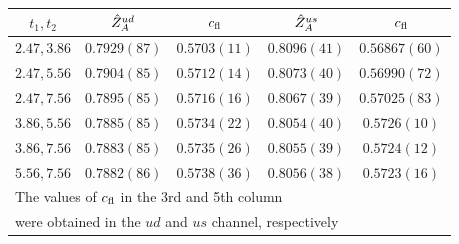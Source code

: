 \topinsert
{}
\begin{center}
\renewcommand{\arraystretch}{1.25}
\begin{tabular}{ccccc}
\hline\hline
$t_1,t_2$ & $\hat{Z}_A^{ud}$ & $c_{\rm fl}$ & $\hat{Z}_A^{us}$ & $c_{\rm fl}$ \\
\hline
$2.47,3.86$ & $0.7929(87)$ & $0.5703(11)$  & $0.8096(41)$ & $0.56867(60)$ \\
$2.47,5.56$ & $0.7904(85)$ & $0.5712(14)$  & $0.8073(40)$ & $0.56990(72)$ \\
$2.47,7.56$ & $0.7895(85)$ & $0.5716(16)$  & $0.8067(39)$ & $0.57025(83)$ \\
$3.86,5.56$ & $0.7885(85)$ & $0.5734(22)$  & $0.8054(40)$ & $0.5726(10)$  \\
$3.86,7.56$ & $0.7883(85)$ & $0.5735(26)$  & $0.8055(39)$ & $0.5724(12)$  \\
$5.56,7.56$ & $0.7882(86)$ & $0.5738(36)$  & $0.8056(38)$ & $0.5723(16)$  \\
\hline\hline
\multicolumn{5}{l}{\footnotesize The values of $c_{\rm fl}$ in the 3rd and 5th column}\\[-3pt]
\multicolumn{5}{l}{\footnotesize were obtained in the $ud$ and $us$ channel, respectively}\\
\end{tabular}
\end{center}
\endinsert
